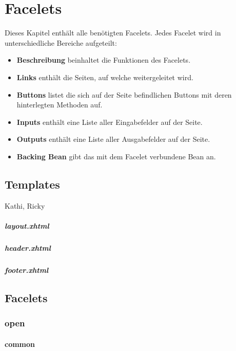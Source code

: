 \chapter{Facelets}

	Dieses Kapitel enthält alle benötigten  Facelets. Jedes Facelet wird in unterschiedliche  Bereiche aufgeteilt:
	\begin{itemize}
		\item \textbf{Beschreibung} beinhaltet die Funktionen des Facelets.
		\item \textbf{Links} enthält die Seiten, auf welche weitergeleitet wird.
		\item \textbf{Buttons} listet die sich auf der Seite befindlichen Buttons mit deren hinterlegten Methoden auf.
		\item \textbf{Inputs} enthält eine Liste aller Eingabefelder auf der Seite.
		\item \textbf{Outputs} enthält eine Liste aller Ausgabefelder auf der Seite.
		\item \textbf{Backing Bean} gibt das mit dem Facelet verbundene Bean an.
	\end{itemize}
	
	\section{Templates}
		Kathi, Ricky
	
		\paragraph{layout.xhtml}
		
		\paragraph{header.xhtml}
		
		\paragraph{footer.xhtml}
	
	\section{Facelets}
	
		\subsection{open}
			
			\subsubsection{common}
			
